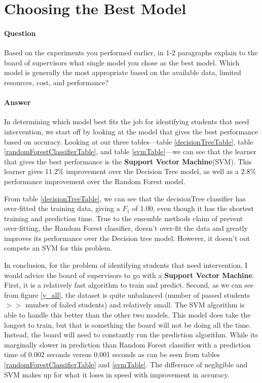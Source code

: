 \documentclass[12pt]{article}
\begin{document}

\section*{Choosing the Best Model}

\paragraph{\textbf{Question}} Based on the experiments you performed earlier, in 1-2 paragraphs explain to the board of supervisors what single model you chose as the best model. Which model is generally the most appropriate based on the available data, limited resources, cost, and performance?

\paragraph{\textbf{Answer}} In determining which model best fits the job for identifying students that need intervention, we start off by looking at the model that gives the best performance based on accuracy. Looking at our three tables---table \ref{decisionTreeTable}, table \ref{randomForestClassifierTable}, and table \ref{svmTable}---we can see that the learner that gives the best performance is the \textbf{Support Vector Machine}(SVM). This learner gives 11.2\% improvement over the Decision Tree model, as well as a 2.8\% performance improvement over the Random Forest model.

From table \ref{decisionTreeTable}, we can see that the decisionTree classifier has over-fitted the training data, giving a $F_1$ of 1.00, even though it has the shortest training and prediction time. True to the ensemble methods claim of prevent over-fitting, the Random Forest classifier, doesn't over-fit the data and greatly improves its performance over the Decision tree model. However, it doesn't out compete an SVM for this problem.

In conclusion, for the problem of identifying students that need intervention, I would advice the board of supervisors to go with a \textbf{Support Vector Machine}. First, it is a relatively fast algorithm to train and predict. Second, as we can see from figure \ref{y_all}, the dataset is quite unbalanced (number of passed students $>>$ number of failed students) and relatively small. The SVM algorithm is able to handle this better than the other two models. This model does take the longest to train, but that is something the board will not be doing all the time. Instead, the board will need to constantly run the prediction algorithm. While its marginally slower in prediction than Random Forest classifier with a prediction time of 0.002 seconds versus 0.001 seconds as can be seen from tables \ref{randomForestClassifierTable} and \ref{svmTable}. The difference of negligible and SVM makes up for what it loses in speed with improvement in accuracy.
\end{document}
